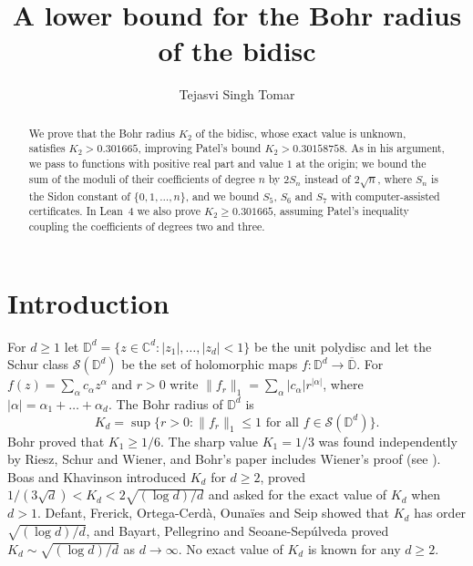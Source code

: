 \documentclass[11pt]{amsart}
\theoremstyle{remark}
\numberwithin{equation}{section}
\newcommand{\C}{\mathbb{C}}
\newcommand{\D}{\mathbb{D}}
\newcommand{\Kbound}{0.301665}
\newcommand{\PatelLB}{0.30158758}
\begin{document}
\title[The Bohr radius of the bidisc]{A lower bound for the Bohr radius of the bidisc}
\author{Tejasvi Singh Tomar}
\renewcommand{\urladdrname}{{\itshape ORCID}}

\begin{abstract}
We prove that the Bohr radius $K_2$ of the bidisc, whose exact value is unknown, satisfies $K_2>\Kbound$, improving Patel's bound $K_2>\PatelLB$. As in his argument, we pass to functions with positive real part and value $1$ at the origin; we bound the sum of the moduli of their coefficients of degree $n$ by $2S_n$ instead of $2\sqrt n$, where $S_n$ is the Sidon constant of $\{0,1,\dots,n\}$, and we bound $S_5$, $S_6$ and $S_7$ with computer-assisted certificates. In Lean~4 we also prove $K_2\ge\Kbound$, assuming Patel's inequality coupling the coefficients of degrees two and three.
\end{abstract}

\maketitle

\section{Introduction}

For $d\ge1$ let $\D^d=\{z\in\C^d:|z_1|,\dots,|z_d|<1\}$ be the unit polydisc and let the Schur class $\mathcal S(\D^d)$ be the set of holomorphic maps $f\colon\D^d\to\overline{\D}$. For $f(z)=\sum_\alpha c_\alpha z^\alpha$ and $r>0$ write $\|f_r\|_1=\sum_\alpha|c_\alpha|r^{|\alpha|}$, where $|\alpha|=\alpha_1+\dots+\alpha_d$. The Bohr radius of $\D^d$ is
\[
K_d=\sup\{r>0:\|f_r\|_1\le1\text{ for all }f\in\mathcal S(\D^d)\}.
\]
Bohr \cite{Boh14} proved that $K_1\ge1/6$. The sharp value $K_1=1/3$ was found independently by Riesz, Schur and Wiener, and Bohr's paper includes Wiener's proof (see \cite{BK97}). Boas and Khavinson \cite{BK97} introduced $K_d$ for $d\ge2$, proved $1/(3\sqrt d)<K_d<2\sqrt{(\log d)/d}$ and asked for the exact value of $K_d$ when $d>1$. Defant, Frerick, Ortega-Cerd\`a, Ouna\"ies and Seip \cite{DFOOS11} showed that $K_d$ has order $\sqrt{(\log d)/d}$, and Bayart, Pellegrino and Seoane-Sep\'ulveda \cite{BPS14} proved $K_d\sim\sqrt{(\log d)/d}$ as $d\to\infty$. No exact value of $K_d$ is known for any $d\ge2$.
\end{document}
